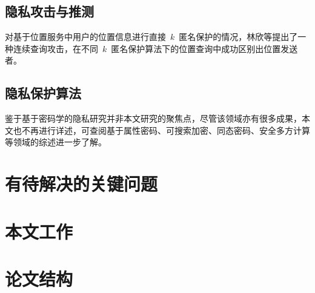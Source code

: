 \subsection{隐私攻击与推测}

对基于位置服务中用户的位置信息进行直接~$k$~匿名保护的情况，林欣等提出了一种连续查询攻击\cite{lin2009lbs}，在不同~$k$~匿名保护算法下的位置查询中成功区别出位置发送者。

\subsection{隐私保护算法}

鉴于基于密码学的隐私研究并非本文研究的聚焦点，尽管该领域亦有很多成果，本文也不再进行详述，可查阅基于属性密码\cite{edemacu2019privacy}、可搜索加密\cite{boesch2014survey,poh2017searchable}、同态密码\cite{acar2018survey}、安全多方计算\cite{cramer2015secure,dugan2016survey}等领域的综述进一步了解。


\section{有待解决的关键问题}


\section{本文工作}

\section{论文结构}